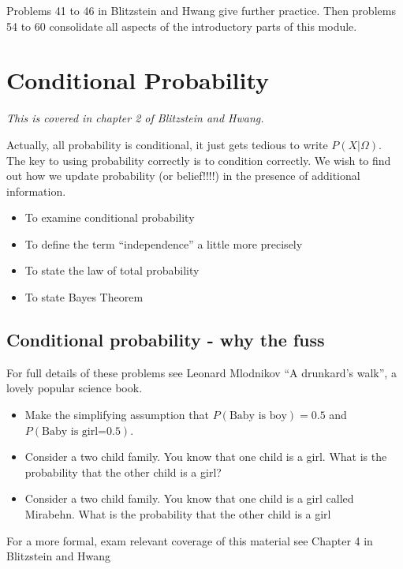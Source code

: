 \documentclass[12pt]{extbook}
\begin{document}
Problems 41 to 46 in Blitzstein and Hwang give further practice.   Then problems 54 to 60 consolidate all aspects of the introductory parts of this module.



\chapter{Conditional Probability}

\textit{This is covered in chapter 2 of Blitzstein and Hwang.}

Actually, all probability is conditional, it just gets tedious to write $P(X|\Omega)$.   The key to using probability correctly is to condition correctly.   
We wish to find out how we update probability (or belief!!!!) in the presence of additional information.

\begin{itemize}
\item To examine conditional probability
\item To define the term ``independence'' a little more precisely
\item To state the law of total probability
\item To state Bayes Theorem
\end{itemize}


% 


 

\section{Conditional probability - why the fuss}

For full details of these problems see Leonard Mlodnikov ``A drunkard's walk'', a lovely popular science book.

\begin{itemize}
\item Make the simplifying assumption that $P(\mbox{Baby is boy}) = 0.5$ and $P(\mbox{Baby is girl=0.5})$.
\item Consider a two child family.   You know that one child is a girl.   What is the probability that the other child is a girl?
\item Consider a two child family.   You know that one child is a girl called Mirabehn.   What is the probability that the other child is a girl
\end{itemize}

For a more formal, exam relevant coverage of this material see Chapter 4 in Blitzstein and Hwang
\end{document}
